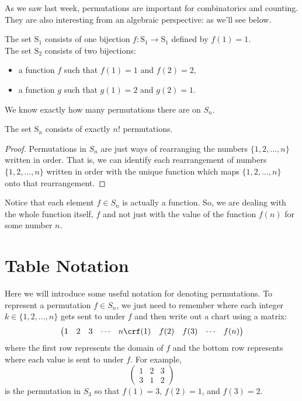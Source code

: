 \documentclass[11pt,dvipsnames]{book}
\numberwithin{equation}{section} %
\numberwithin{figure}{section} %
\numberwithin{table}{section} %
\begin{document}
As we saw last week, permutations are important for combinatorics and counting. They are also interesting from an algebraic perspective: as we'll see below.


 \begin{example}  
The set $\mathrm{S}_{1}$ consists of one
bijection $f:\mathrm{S}_{1}\rightarrow\mathrm{S}_{1}$ defined by $f(1)=1$.\\

The set $\mathrm{S}_{2}$ consists of two
bijections:
\begin{itemize}%
\item a function $f$ such that $f(1)=1$ and $f(2)=2$,%
\item a function $g$ such that $g(1)=2$ and $g(2)=1$.%
\end{itemize}
\end{example}

We know exactly how many permutations there are on $S_{n}$.

\begin{lemma}%
 The set $\mathrm{S}_n$ consists of exactly $n!$ permutations.
\end{lemma}
\begin{proof}
Permutations in $S_{n}$ are just ways of rearranging the numbers $\{1,2,...,n\}$ written in order. That is, we can identify each rearrangement of numbers $\{1,2,...,n\}$ written in order with the unique function which maps $\{1,2,...,n\}$ onto that rearrangement. 
\end{proof}

Notice that each element $f\in S_{n}$ is actually a function.
So, we are dealing with the whole function itself, \(f\) and not just with the value of the function \(f(n)\) for some number \(n\).

\section{Table Notation}

Here we will introduce some useful notation for denoting permutations. To represent a permutation $f\in S_n$,  we just need to remember where each integer $k\in \{1,2,...,n\}$ gets sent to under $f$ and then write out a chart using a matrix:
 $$
\left(\begin{matrix} %
1 & 2 & 3 & \cdots & n \cr%
f(1) & f(2) & f(3) & \cdots & f(n) \cr%
\end{matrix}\right)
$$
where the first row represents the domain of $f$ and the bottom row represents where each value is sent to under $f$. For example,
 $$
\left(\begin{matrix} %
1 & 2 & 3  \\
3 & 1 & 2
\end{matrix}\right)
$$
is the permutation in $S_{3}$ so that $f(1)=3$, $f(2)=1$, and $f(3)=2$. 
\end{document}
